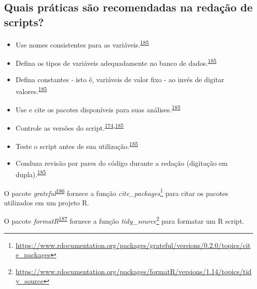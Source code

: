 \documentclass[
  a4paper,
]{book}
\renewcommand{\href}[2]{#2\footnote{\url{#1}}}
\newenvironment{infobox}[1]
  {
  \begin{itemize}
  \renewcommand{\labelitemi}{
    \raisebox{-.7\height}[0pt][0pt]{
      {\setkeys{Gin}{width=3em,keepaspectratio}
        \texttt{[image: \#1]}}
    }
  }
  \setlength{\fboxsep}{1em}
  \begin{blackbox}
  \item
  }
  {
  \end{blackbox}
  \end{itemize}
  }
\begin{document}
\hypertarget{quais-pruxe1ticas-suxe3o-recomendadas-na-redauxe7uxe3o-de-scripts}{%
\subsection{Quais práticas são recomendadas na redação de scripts?}\label{quais-pruxe1ticas-suxe3o-recomendadas-na-redauxe7uxe3o-de-scripts}}

\begin{itemize}
\item
  Use nomes consistentes para as variáveis.\textsuperscript{\protect\hyperlink{ref-SchwabSimon2021}{185}}
\item
  Defina os tipos de variáveis adequadamente no banco de dados.\textsuperscript{\protect\hyperlink{ref-SchwabSimon2021}{185}}
\item
  Defina constantes - isto é, variáveis de valor fixo - ao invés de digitar valores.\textsuperscript{\protect\hyperlink{ref-SchwabSimon2021}{185}}
\item
  Use e cite os pacotes disponíveis para suas análises.\textsuperscript{\protect\hyperlink{ref-SchwabSimon2021}{185}}
\item
  Controle as versões do script.\textsuperscript{\protect\hyperlink{ref-Eglen2017}{174},\protect\hyperlink{ref-SchwabSimon2021}{185}}
\item
  Teste o script antes de sua utilização.\textsuperscript{\protect\hyperlink{ref-SchwabSimon2021}{185}}
\item
  Conduza revisão por pares do código durante a redação (digitação em dupla).\textsuperscript{\protect\hyperlink{ref-SchwabSimon2021}{185}}
\end{itemize}

\begin{infobox}{images/Rlogo}
O pacote \emph{grateful}\textsuperscript{\protect\hyperlink{ref-grateful}{186}} fornece a função \href{https://www.rdocumentation.org/packages/grateful/versions/0.2.0/topics/cite_packages}{\emph{cite\_packages}} para citar os pacotes utilizados em um projeto R.

\end{infobox}

\begin{infobox}{images/Rlogo}
O pacote \emph{formatR}\textsuperscript{\protect\hyperlink{ref-formatR}{187}} fornece a função \href{https://www.rdocumentation.org/packages/formatR/versions/1.14/topics/tidy_source}{\emph{tidy\_source}} para formatar um R script.

\end{infobox}
\end{document}
